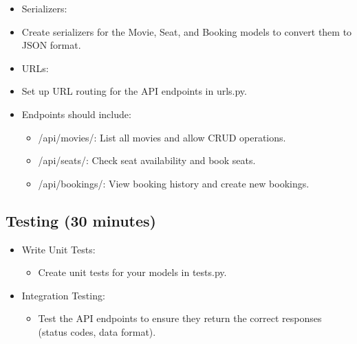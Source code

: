 \documentclass{article}
\begin{document}
\begin{itemize}
    \item Serializers:
\end{itemize}
\begin{itemize}
    \item Create serializers for the Movie, Seat, and Booking models to convert them to JSON format.
\end{itemize}
\begin{itemize}
    \item URLs:
\end{itemize}
\begin{itemize}
    \item Set up URL routing for the API endpoints in urls.py.
\end{itemize}
\begin{itemize}
            \item Endpoints should include:
            \begin{itemize}
                \item /api/movies/: List all movies and allow CRUD operations.
            \end{itemize}
            \begin{itemize}
                \item /api/seats/: Check seat availability and book seats.
            \end{itemize}
            \begin{itemize}
                \item /api/bookings/: View booking history and create new bookings.
            \end{itemize}
\end{itemize}

\subsection{Testing (30 minutes)}
\begin{itemize}
    \item Write Unit Tests: 
    \begin{itemize}
        \item Create unit tests for your models in tests.py.
    \end{itemize}
\end{itemize}
\begin{itemize}
    \item Integration Testing: 
    \begin{itemize}
        \item Test the API endpoints to ensure they return the correct responses (status codes, data format).
    \end{itemize}
\end{itemize}
\end{document}
